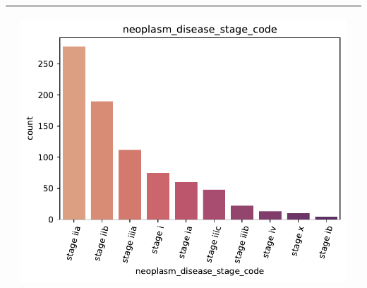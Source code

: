 \begin{table}[!htb]
\begin{threeparttable}
\begin{tabular}{p{2.5cm} p{7cm} p{6.5cm}}
			& \begin{center}\includegraphics[width=1\linewidth]{NOTEBOOK/IMAGENES_DESCRIPTIVAS/4_neoplasm_disease_stage_code}\end{center}
			\\ \hline
		\end{tabular}
	\end{threeparttable}
\end{table}


